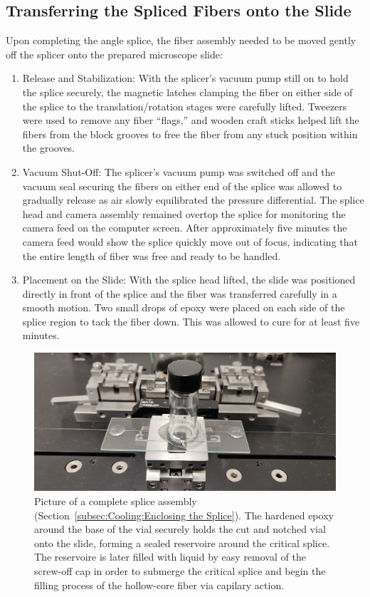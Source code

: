 \subsection{Transferring the Spliced Fibers onto the Slide}
\label{subsec:Cooling:Transferring the Spliced Fibers onto the Slide}

Upon completing the angle splice, the fiber assembly needed to be moved gently off the splicer onto the prepared microscope slide:

\begin{enumerate}
	\item Release and Stabilization: With the splicer’s vacuum pump still on to hold the splice securely, the magnetic latches clamping the fiber on either side of the splice to the translation/rotation stages were carefully lifted. Tweezers were used to remove any fiber “flags,” and wooden craft sticks helped lift the fibers from the block grooves to free the fiber from any stuck position within the grooves.
  \item Vacuum Shut-Off: The splicer's vacuum pump was switched off and the vacuum seal securing the fibers on either end of the splice was allowed to gradually release as air slowly equilibrated the pressure differential. The splice head and camera assembly remained overtop the splice for monitoring the camera feed on the computer screen. After approximately five minutes the camera feed would show the splice quickly move out of focus, indicating that the entire length of fiber was free and ready to be handled.
	\item Placement on the Slide: With the splice head lifted, the slide was positioned directly in front of the splice and the fiber was transferred carefully in a smooth motion. Two small drops of epoxy were placed on each side of the splice region to tack the fiber down. This was allowed to cure for at least five minutes.
\end{enumerate}

\begin{figure}[t]
  \centering
  \includegraphics[width=\textwidth]{figs/3-Cooling/successfullyBuiltSplice.jpg}
  \caption{Picture of a complete splice assembly (Section~\ref{subsec:Cooling:Enclosing the Splice}). The hardened epoxy around the base of the vial securely holds the cut and notched vial onto the slide, forming a sealed reservoire around the critical splice. The reservoire is later filled with liquid  by easy removal of the screw-off cap in order to submerge the critical splice and begin the filling process of the hollow-core fiber via capilary action.}
  \label{fig:successfully build splice}
\end{figure}

